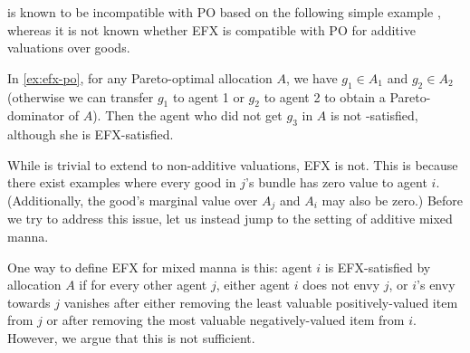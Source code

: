 \EFXZero{} is known to be incompatible with PO based on the following simple example \citep{plaut2020almost},
whereas it is not known whether EFX is compatible with PO for additive valuations over goods.


In \cref{ex:efx-po}, for any Pareto-optimal allocation $A$, we have $g_1 \in A_1$ and $g_2 \in A_2$
(otherwise we can transfer $g_1$ to agent 1 or $g_2$ to agent 2 to obtain a Pareto-dominator of $A$).
Then the agent who did not get $g_3$ in $A$ is not \EFXZero-satisfied, although she is EFX-satisfied.

While \EFXZero{} is trivial to extend to non-additive valuations, EFX is not.
This is because there exist examples where every good in $j$'s bundle has zero value to agent $i$.
(Additionally, the good's marginal value over $A_j$ and $A_i$ may also be zero.)
Before we try to address this issue, let us instead jump to the setting of additive mixed manna.

One way to define EFX for mixed manna is this:
agent $i$ is EFX-satisfied by allocation $A$ if for every other agent $j$,
either agent $i$ does not envy $j$, or $i$'s envy towards $j$ vanishes after
either removing the least valuable positively-valued item from $j$
or after removing the most valuable negatively-valued item from $i$.
However, we argue that this is not sufficient.

